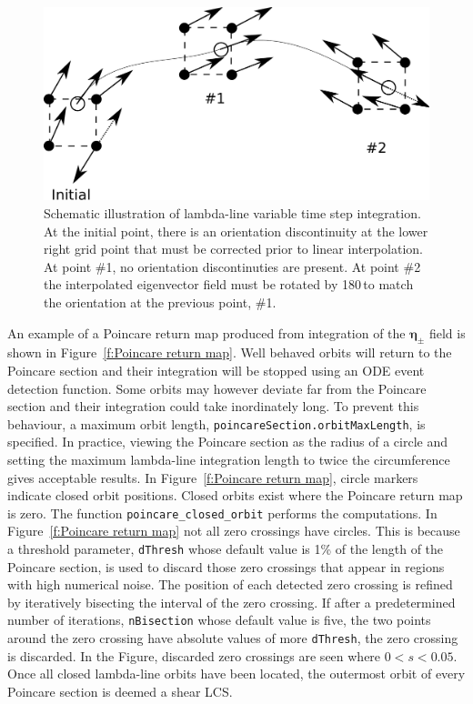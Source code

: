 \documentclass{article}
\begin{document}
\begin{figure}
\begin{center}
\includegraphics[width=\textwidth]{graphics/variable_step_integration}
\end{center}
\caption{Schematic illustration of lambda-line variable time step integration. At the initial point, there is an orientation discontinuity at the lower right grid point that must be corrected prior to linear interpolation. At point \#1, no orientation discontinuties are present. At point \#2 the interpolated eigenvector field must be rotated by 180\degree\,to match the orientation at the previous point, \#1.}
\label{f:variable step integration}
\end{figure}

An example of a Poincare return map produced from integration of the $\boldsymbol \eta_\pm$ field is shown in Figure~\ref{f:Poincare return map}. Well behaved orbits will return to the Poincare section and their integration will be stopped using an ODE event detection function. Some orbits may however deviate far from the Poincare section and their integration could take inordinately long. To prevent this behaviour, a maximum orbit length, \lstinline!poincareSection.orbitMaxLength!, is specified. In practice, viewing the Poincare section as the radius of a circle and setting the maximum lambda-line integration length to twice the circumference gives acceptable results. In Figure~\ref{f:Poincare return map}, circle markers indicate closed orbit positions. Closed orbits exist where the Poincare return map is zero. The function \lstinline!poincare_closed_orbit! performs the computations. In Figure~\ref{f:Poincare return map} not all zero crossings have circles. This is because a threshold parameter, \lstinline!dThresh! whose default value is 1\% of the length of the Poincare section, is used to discard those zero crossings that appear in regions with high numerical noise. The position of each detected zero crossing is refined by iteratively bisecting the interval of the zero crossing. If after a predetermined number of iterations, \lstinline!nBisection! whose default value is five, the two points around the zero crossing have absolute values of more \lstinline!dThresh!, the zero crossing is discarded. In the Figure, discarded zero crossings are seen where $0 < s < 0.05$. Once all closed lambda-line orbits have been located, the outermost orbit of every Poincare section is deemed a shear LCS.
\end{document}
